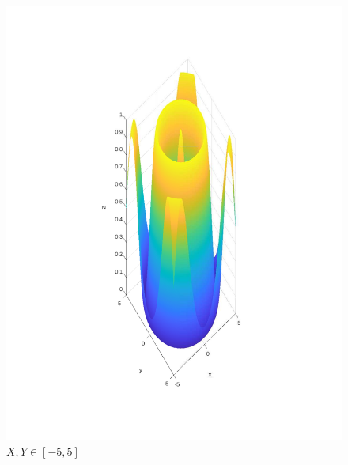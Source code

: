 \documentclass{article}
\begin{document}
\newpage
\begin{figure}[h!]
\centering
\includegraphics[scale=.6]{images/myplot5a.pdf}
\caption{$X,Y \in [-5, 5]$}
\label{fig:plot5a_f6}
\end{figure}
\end{document}
